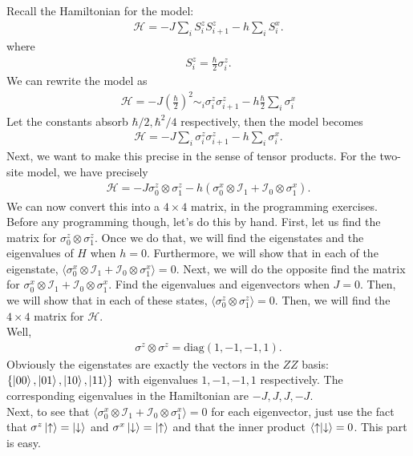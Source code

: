 \documentclass{book}
\theoremstyle{definition}
\newcommand{\had}{\mathcal{H}}
\newcommand{\f}[2]{\frac{#1}{#2}}
\newcommand{\lp}{\left(}
\newcommand{\rp}{\right)}
\newcommand{\Id}{\mathcal{I}}
\begin{document}
Recall the Hamiltonian for the model:
\begin{align}
\had = -J \sum_i S_i^z S_{i+1}^z - h \sum_i S_i^x.
\end{align}
where
\begin{align}
S_i^z = \f{\hbar}{2}\sigma_i^z.
\end{align}
We can rewrite the model as
\begin{align}
\had = -J \lp \f{\hbar}{2} \rp^2 \sim_i \sigma_i^z \sigma_{i+1}^z - h \f{\hbar}{2}\sum_i \sigma^x_i
\end{align}
Let the constants absorb $\hbar/2, \hbar^2/4$ respectively, then the model becomes
\begin{align}
\had = -J \sum_i \sigma_i^z\sigma_{i+1}^z - h\sum_i \sigma_i^x.
\end{align}
Next, we want to make this precise in the sense of tensor products. For the two-site model, we have precisely
\begin{align}
\had = -J \sigma_0^z \otimes \sigma_1^z - h (\sigma_0^x \otimes \Id_1 + \Id_0\otimes\sigma_1^x).
\end{align} 
We can now convert this into a $4\times 4$ matrix, in the programming exercises. \\

Before any programming though, let's do this by hand. First, let us find the matrix for $\sigma_0^z \otimes \sigma_1^z$. Once we do that, we will find the eigenstates and the eigenvalues of $H$ when $h=0$. Furthermore, we will show that in each of the eigenstate, $\langle \sigma_0^x\otimes \Id_1 + \Id_0 \otimes \sigma_1^x \rangle = 0$. Next, we will do the opposite find the matrix for $\sigma_0^x\otimes \Id_1 + \Id_0 \otimes \sigma_1^x$. Find the eigenvalues and eigenvectors when $J =0$. Then, we will show that in each of these states, $\langle \sigma_0^z \otimes \sigma_1^z \rangle = 0$. Then, we will find the $4\times 4$ matrix for $\had$. \\

Well,
\begin{align}
\sigma^z \otimes \sigma^z = \text{diag}(1,-1,-1,1).
\end{align} 
Obviously the eigenstates are exactly the vectors in the $ZZ$ basis: $\{ \ket{00}, \ket{01}, \ket{10}, \ket{11}\}$ with eigenvalues $1,-1,-1,1$ respectively. The corresponding eigenvalues in the Hamiltonian are $-J,J,J,-J$. \\

Next, to see that $\langle \sigma_0^x\otimes \Id_1 + \Id_0 \otimes \sigma_1^x \rangle = 0$ for each eigenvector, just use the fact that $\sigma^z\ket{\uparrow} = \ket{\downarrow}$ and $\sigma^x\ket{\downarrow} = \ket{\uparrow}$ and that the inner product $\braket{\uparrow}{\downarrow} = 0$. This part is easy.\\
\end{document}
